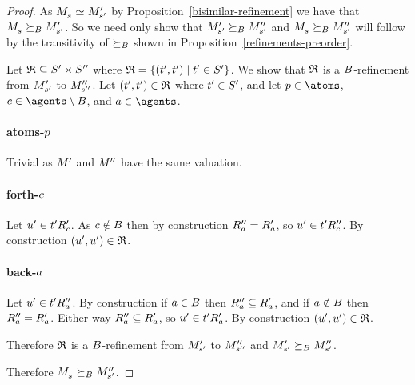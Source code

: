 \begin{proof}
As $\kPModel{\kStateS} \bisimilar \kPModelP{\kStateSP}$ by Proposition~\ref{bisimilar-refinement} we have that $\kPModel{\kStateS} \simulatesBs \kPModelP{\kStateSP}$.
So we need only show that ${M^{\prime}_{{s}^{\prime}}} \succeq_{B} {M^{\prime\prime}_{{s}^{\prime}}}$ and $\kPModel{\kStateS} \simulatesBs \kPModelPP{\kStateSP}$ will follow by the transitivity of $\succeq_{B}$ shown in Proposition~\ref{refinements-preorder}.

Let $\mathfrak{R} \subseteq {S^{\prime}} \times {S^{\prime\prime}}$ where $\mathfrak{R} = \{({t}^{\prime}, {t}^{\prime}) \mid {t}^{\prime} \in {S^{\prime}}\}$.
We show that $\mathfrak{R}$ is a $B$-refinement from ${M^{\prime}_{{s}^{\prime}}}$ to ${M^{\prime\prime}_{{s}^{\prime\prime}}}$.
Let $({t}^{\prime}, {t}^{\prime}) \in \mathfrak{R}$ where ${t}^{\prime} \in {S^{\prime}}$, and let $\atomP \in \atoms$, $\agentC \in \agents \setminus \agentsB$, and $\agentA \in \agents$.

\paragraph{atoms-$p$}
Trivial as ${M^{\prime}_{}}$ and ${M^{\prime\prime}_{}}$ have the same valuation.

\paragraph{forth-$c$}
Let ${u}^{\prime} \in {{t}^{\prime}} {R^{\prime}_{c}}$.
As $c \notin B$ then by construction ${R^{\prime\prime}_{a}} = {R^{\prime}_{a}}$, so ${u}^{\prime} \in {{t}^{\prime}} {R^{\prime\prime}_{c}}$.
By construction $({u}^{\prime}, {u}^{\prime}) \in \mathfrak{R}$.

\paragraph{back-$a$}
Let ${u}^{\prime} \in {{t}^{\prime}} {R^{\prime\prime}_{a}}$.
By construction if $a \in B$ then ${R^{\prime\prime}_{a}} \subseteq {R^{\prime}_{a}}$, and if $a \notin B$ then ${R^{\prime\prime}_{a}} = {R^{\prime}_{a}}$.
Either way ${R^{\prime\prime}_{a}} \subseteq {R^{\prime}_{a}}$, so ${u}^{\prime} \in {{t}^{\prime}} {R^{\prime}_{a}}$.
By construction $({u}^{\prime}, {u}^{\prime}) \in \mathfrak{R}$.

Therefore $\mathfrak{R}$ is a $B$-refinement from ${M^{\prime}_{{s}^{\prime}}}$ to ${M^{\prime\prime}_{{s}^{\prime\prime}}}$ and ${M^{\prime}_{{s}^{\prime}}} \succeq_{B} {M^{\prime\prime}_{{s}^{\prime}}}$.

Therefore $\kPModel{\kStateS} \simulatesBs \kPModelPP{\kStateSP}$.
\end{proof}

